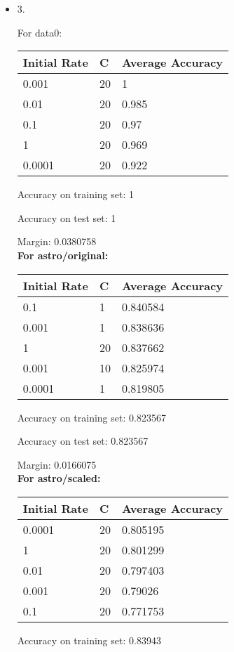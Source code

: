 \documentclass[12pt]{exam}
\begin{document}
\begin{itemize}
\item[] 3.
\begin{solution}
For data0:\\
\begin{center}
\begin{tabular}{lll} \hline
\textbf{Initial Rate } & \textbf{C} & \textbf{Average Accuracy}\\ \hline
0.001&                   20      &                1\\
0.01  &                  20     &                 0.985\\
0.1    &                 20    &                  0.97\\
1       &                20   &                   0.969\\
0.0001   &               20  &                    0.922
\end{tabular}
\end{center}
Accuracy on training set: 1

Accuracy on test set: 1


Margin: 0.0380758\\

\textbf{For astro/original:}\\
\begin{center}
\begin{tabular}{lll} \hline
\textbf{Initial Rate } & \textbf{C} & \textbf{Average Accuracy}\\ \hline
0.1  &                   1    &                   0.840584\\
0.001 &                  1   &                    0.838636\\
1       &                20 &                     0.837662\\
0.001    &               10&                      0.825974\\
0.0001    &              1&                       0.819805
\end{tabular}
\end{center}

Accuracy on training set: 0.823567

Accuracy on test set: 0.823567


Margin: 0.0166075\\

\textbf{For astro/scaled:}\\
\begin{center}
\begin{tabular}{lll} \hline
\textbf{Initial Rate } & \textbf{C} & \textbf{Average Accuracy}\\ \hline
0.0001 &                 20     &                 0.805195\\
1       &                20    &                  0.801299\\
0.01     &               20  &                    0.797403\\
0.001      &             20 &                     0.79026\\
0.1         &            20&                      0.771753
\end{tabular}
\end{center}
Accuracy on training set: 0.83943


\end{solution}
\end{itemize}
\end{document}
